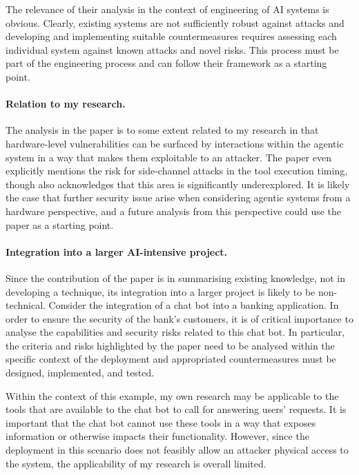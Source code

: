 \documentclass{article}
\begin{document}
The relevance of their analysis in the context of engineering of AI systems is obvious. Clearly, existing systems are not sufficiently robust against attacks and developing and implementing suitable countermeasures requires assessing each individual system against known attacks and novel risks. This process must be part of the engineering process and can follow their framework as a starting point.

\paragraph{Relation to my research.}

The analysis in the paper is to some extent related to my research in that hardware-level vulnerabilities can be surfaced by interactions within the agentic system in a way that makes them exploitable to an attacker. The paper even explicitly mentions the risk for side-channel attacks in the tool execution timing, though also acknowledges that this area is significantly underexplored. It is likely the case that further security issue arise when considering agentic systems from a hardware perspective, and a future analysis from this perspective could use the paper as a starting point.

\paragraph{Integration into a larger AI-intensive project.}

Since the contribution of the paper is in summarising existing knowledge, not in developing a technique, its integration into a larger project is likely to be non-technical. Consider the integration of a chat bot into a banking application. In order to ensure the security of the bank's customers, it is of critical importance to analyse the capabilities and security risks related to this chat bot. In particular, the criteria and risks highlighted by the paper need to be analysed within the specific context of the deployment and appropriated countermeasures must be designed, implemented, and tested.

Within the context of this example, my own research may be applicable to the tools that are available to the chat bot to call for answering users' requests. It is important that the chat bot cannot use these tools in a way that exposes information or otherwise impacts their functionality. However, since the deployment in this scenario does not feasibly allow an attacker physical access to the system, the applicability of my research is overall limited.
\end{document}
